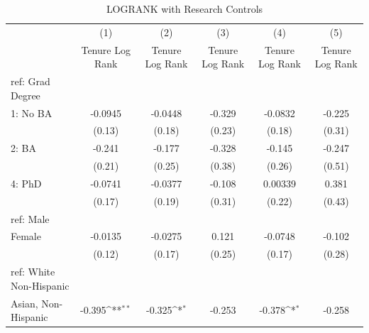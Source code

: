 \begin{table}[htbp]\centering
\def\sym#1{\ifmmode^{#1}\else\(^{#1}\)\fi}
\caption{LOGRANK with Research Controls \label{tab1}}
\begin{tabular}{l*{5}{c}}
\hline\hline
  &\multicolumn{1}{c}{(1)}         &\multicolumn{1}{c}{(2)}         &\multicolumn{1}{c}{(3)}         &\multicolumn{1}{c}{(4)}         &\multicolumn{1}{c}{(5)}         \\
  &Tenure Log Rank         &Tenure Log Rank         &Tenure Log Rank         &Tenure Log Rank         &Tenure Log Rank         \\
\hline
ref: Grad Degree&                     &                     &                     &                     &                     \\
[1em]
1: No BA&     -0.0945         &     -0.0448         &      -0.329         &     -0.0832         &      -0.225         \\
  &      (0.13)         &      (0.18)         &      (0.23)         &      (0.18)         &      (0.31)         \\
[1em]
2: BA&      -0.241         &      -0.177         &      -0.328         &      -0.145         &      -0.247         \\
  &      (0.21)         &      (0.25)         &      (0.38)         &      (0.26)         &      (0.51)         \\
[1em]
4: PhD&     -0.0741         &     -0.0377         &      -0.108         &     0.00339         &       0.381         \\
  &      (0.17)         &      (0.19)         &      (0.31)         &      (0.22)         &      (0.43)         \\
[1em]
ref: Male&                     &                     &                     &                     &                     \\
[1em]
Female&     -0.0135         &     -0.0275         &       0.121         &     -0.0748         &      -0.102         \\
  &      (0.12)         &      (0.17)         &      (0.25)         &      (0.17)         &      (0.28)         \\
[1em]
ref: White Non-Hispanic&                     &                     &                     &                     &                     \\
[1em]
Asian, Non-Hispanic&      -0.395\sym{**} &      -0.325\sym{*}  &      -0.253         &      -0.378\sym{*}  &      -0.258         \\

\end{tabular}
\end{table}
